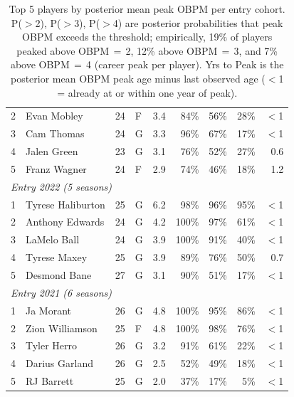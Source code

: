 \begin{table}[htbp]
\begin{tabular}{rlrlrrrrr}
    2 & Evan Mobley & 24 & F & 3.4 & 84\% & 56\% & 28\% & $<$1 \\
    3 & Cam Thomas & 24 & G & 3.3 & 96\% & 67\% & 17\% & $<$1 \\
    4 & Jalen Green & 23 & G & 3.1 & 76\% & 52\% & 27\% & 0.6 \\
    5 & Franz Wagner & 24 & F & 2.9 & 74\% & 46\% & 18\% & 1.2 \\
    \midrule[0.4pt]
    \multicolumn{9}{l}{\textit{Entry 2022 (5 seasons)}} \\
    \midrule
    1 & Tyrese Haliburton & 25 & G & 6.2 & 98\% & 96\% & 95\% & $<$1 \\
    2 & Anthony Edwards & 24 & G & 4.2 & 100\% & 97\% & 61\% & $<$1 \\
    3 & LaMelo Ball & 24 & G & 3.9 & 100\% & 91\% & 40\% & $<$1 \\
    4 & Tyrese Maxey & 25 & G & 3.9 & 89\% & 76\% & 50\% & 0.7 \\
    5 & Desmond Bane & 27 & G & 3.1 & 90\% & 51\% & 17\% & $<$1 \\
    \midrule[0.4pt]
    \multicolumn{9}{l}{\textit{Entry 2021 (6 seasons)}} \\
    \midrule
    1 & Ja Morant & 26 & G & 4.8 & 100\% & 95\% & 86\% & $<$1 \\
    2 & Zion Williamson & 25 & F & 4.8 & 100\% & 98\% & 76\% & $<$1 \\
    3 & Tyler Herro & 26 & G & 3.2 & 91\% & 61\% & 22\% & $<$1 \\
    4 & Darius Garland & 26 & G & 2.5 & 52\% & 49\% & 18\% & $<$1 \\
    5 & RJ Barrett & 25 & G & 2.0 & 37\% & 17\% & 5\% & $<$1 \\
    \bottomrule
  \end{tabular}
  \caption{Top 5 players by posterior mean peak OBPM per entry cohort. P($>$2), P($>$3), P($>$4) are posterior probabilities that peak OBPM exceeds the threshold; empirically, 19\% of players peaked above OBPM\,$=$\,2, 12\% above OBPM\,$=$\,3, and 7\% above OBPM\,$=$\,4 (career peak per player). Yrs to Peak is the posterior mean OBPM peak age minus last observed age ($<$1 = already at or within one year of peak).}
  \label{tab:breakout_cohort}
\end{table}

